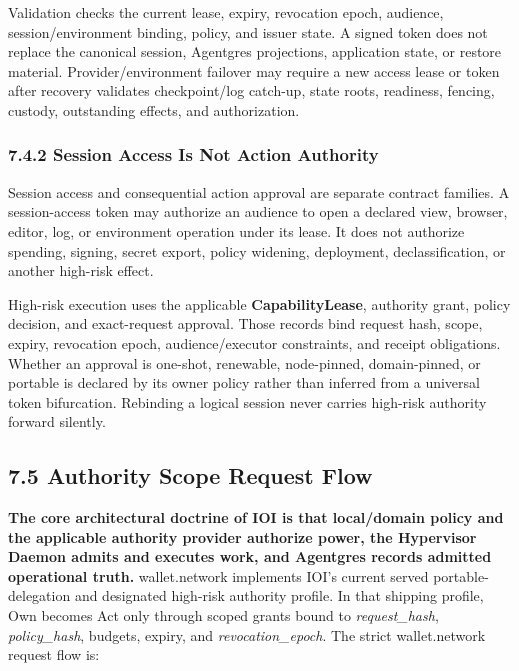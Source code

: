 \documentclass[
  11pt,
]{article}
\begin{document}
Validation checks the current lease, expiry, revocation epoch, audience,
session/environment binding, policy, and issuer state. A signed token does not
replace the canonical session, Agentgres projections, application state, or
restore material. Provider/environment failover may require a new access lease
or token after recovery validates checkpoint/log catch-up, state roots,
readiness, fencing, custody, outstanding effects, and authorization.

\hypertarget{the-auth-split-portable-vs.-pinned-authority}{%
\subsubsection{7.4.2 Session Access Is Not Action
Authority}\label{the-auth-split-portable-vs.-pinned-authority}}

Session access and consequential action approval are separate contract
families. A session-access token may authorize an audience to open a declared
view, browser, editor, log, or environment operation under its lease. It does
not authorize spending, signing, secret export, policy widening, deployment,
declassification, or another high-risk effect.

High-risk execution uses the applicable \textbf{CapabilityLease}, authority
grant, policy decision, and exact-request approval. Those records bind request
hash, scope, expiry, revocation epoch, audience/executor constraints, and
receipt obligations. Whether an approval is one-shot, renewable, node-pinned,
domain-pinned, or portable is declared by its owner policy rather than inferred
from a universal token bifurcation. Rebinding a logical session never carries
high-risk authority forward silently.

\hypertarget{authority-scope-request-flow}{%
\subsection{7.5 Authority Scope Request
Flow}\label{authority-scope-request-flow}}

\textbf{The core architectural doctrine of IOI is that local/domain policy
and the applicable authority provider authorize power, the Hypervisor Daemon
admits and executes work, and Agentgres records admitted operational truth.}
wallet.network implements IOI's current served portable-delegation and
designated high-risk authority profile. In that shipping profile, Own becomes
Act only through scoped grants bound to
\emph{request\_hash}, \emph{policy\_hash}, budgets, expiry, and
\emph{revocation\_epoch}. The strict wallet.network request flow is:
\end{document}
